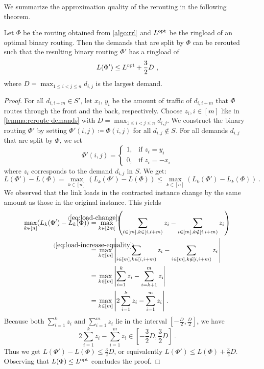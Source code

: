 We summarize the approximation quality of the rerouting in the following theorem.
\begin{theorem}
	\label{theo:ring-loading-algorithm}
	Let $\Phi$ be the routing obtained from \cref{algo:rrl} and $L^{\mathrm{opt}}$ be the ringload of an optimal binary routing.
	Then the demands that are split by $\Phi$ can be rerouted such that the resulting binary routing $\Phi'$ has a ringload of
	\begin{equation}
		L(\Phi') \leq L^{\mathrm{opt}} + \frac{3}{2}D \ ,
	\end{equation}
	where $D = \max_{1 \leq i < j \leq n} d_{i, j}$ is the largest demand.
\end{theorem}
\begin{proof}
	For all $d_{i, i+m} \in S'$, let $x_i$, $y_i$ be the amount of traffic of $d_{i, i+m}$ that $\Phi$ routes through the front and the back, respectively.
	Choose $z_i, i \in [m]$ like in \cref{lemma:reroute-demands} with $D = \max_{1 \leq i < j \leq n} d_{i, j}$.
	We construct the binary routing $\Phi'$ by setting $\Phi'(i, j) \coloneqq \Phi(i, j)$ for all $d_{i,j} \notin S$.
	For all demands $d_{i, j}$ that are split by $\Phi$, we set
	\begin{equation}
		\Phi'(i, j) = \begin{cases}
			1, & \text{if } z_i = y_i \\
			0, & \text{if } z_i = -x_i
		\end{cases}
	\end{equation}
	where $z_i$ corresponds to the demand $d_{i, j}$ in $S$.
	We get:
	\begin{equation}
		L(\Phi') - L(\Phi) 
		= \max_{k \in [n]} (L_k(\Phi') - L(\Phi)) 
		\leq \max_{k \in [n]} (L_k(\Phi') - L_k(\Phi)) \ .
	\end{equation}
	We observed that the link loads in the contracted instance change by the same amount as those in the original instance.
	This yields
	\begin{align}
		\max_{k \in [n]} (L_k(\Phi') - L_k(\Phi)) 
		&\stackrel{\mathclap{(\ref{eq:load-change})}}{=} \max_{k \in [2m]} \left(\sum_{\substack{i \in [m], k \in [i, i+m)}} z_i - \sum_{\substack{i \in [m], k \notin[i, i+m)}} z_i \right)\\
		&\stackrel{\mathclap{(\ref{eq:load-increase-equality})}}{=} \max_{k \in [m]} \abs{\sum_{\substack{i \in [m], k \in [i, i+m)}} z_i - \sum_{\substack{i \in [m], k \notin[i, i+m)}} z_i} \\
		& = \max_{k \in [m]} \abs{\sum_{i = 1}^k z_i - \sum_{i = k+1}^m z_i }\\
		& = \max_{k \in [m]} \abs{2\sum_{i = 1}^k z_i - \sum_{i = 1}^m z_i } \ . \label{eq:partial-reroutes}
	\end{align}
	Because both $\sum_{i = 1}^k z_i$ and $\sum_{i = 1}^m z_i$ lie in the interval $[-\frac{D}{2}, \frac{D}{2}]$, 
	we have 
	\begin{equation}
		2\sum_{i = 1}^k z_i - \sum_{i = 1}^m z_i \in [-\frac{3}{2}D, \frac{3}{2}D] \ .
	\end{equation}
	Thus we get $L(\Phi') - L(\Phi) \leq \frac{3}{2}D$, or equivalently $L(\Phi') \leq L(\Phi) + \frac{3}{2}D$.
	Observing that $L(\Phi) \leq L^{\mathrm{opt}}$ concludes the proof.
\end{proof}

